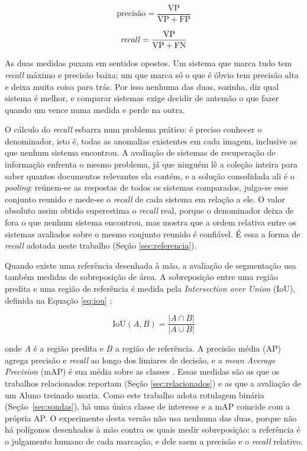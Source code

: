 \begin{equation}
  \text{precisão} = \frac{\mathrm{VP}}{\mathrm{VP} + \mathrm{FP}}
  \label{eq:prec_geral}
\end{equation}

\begin{equation}
  \text{\textit{recall}} = \frac{\mathrm{VP}}{\mathrm{VP} + \mathrm{FN}}
  \label{eq:rec_geral}
\end{equation}

As duas medidas puxam em sentidos opostos. Um sistema que marca tudo tem \textit{recall} máximo e precisão baixa; um que marca só o que é óbvio tem precisão alta e deixa muita coisa para trás. Por isso nenhuma das duas, sozinha, diz qual sistema é melhor, e comparar sistemas exige decidir de antemão o que fazer quando um vence numa medida e perde na outra.

O cálculo do \textit{recall} esbarra num problema prático: é preciso conhecer o denominador, isto é, todas as anomalias existentes em cada imagem, inclusive as que nenhum sistema encontrou. A avaliação de sistemas de recuperação de informação enfrenta o mesmo problema, já que ninguém lê a coleção inteira para saber quantos documentos relevantes ela contém, e a solução consolidada ali é o \textit{pooling}: reúnem-se as respostas de todos os sistemas comparados, julga-se esse conjunto reunido e mede-se o \textit{recall} de cada sistema em relação a ele. O valor absoluto assim obtido superestima o \textit{recall} real, porque o denominador deixa de fora o que nenhum sistema encontrou, mas  mostra que a ordem relativa entre os sistemas avaliados sobre o mesmo conjunto reunido é confiável. É essa a forma de \textit{recall} adotada neste trabalho (Seção \ref{sec:referencia}).

Quando existe uma referência desenhada à mão, a avaliação de segmentação usa também medidas de sobreposição de área. A sobreposição entre uma região predita e uma região de referência é medida pela \textit{Intersection over Union} (IoU), definida na Equação \ref{eq:iou} \cite{voc_everingham2010}:

\begin{equation}
  \mathrm{IoU}(A, B) = \frac{|A \cap B|}{|A \cup B|}
  \label{eq:iou}
\end{equation}

\noindent onde $A$ é a região predita e $B$ a região de referência. A precisão média (AP) agrega precisão e \textit{recall} ao longo dos limiares de decisão, e a \textit{mean Average Precision} (mAP) é sua média sobre as classes \cite{voc_everingham2010}. Essas medidas são as que os trabalhos relacionados reportam (Seção \ref{sec:relacionados}) e as que a avaliação de um Aluno treinado usaria. Como este trabalho adota rotulagem binária (Seção~\ref{sec:sondas}), há uma única classe de interesse e a mAP coincide com a própria AP. O experimento desta versão não usa nenhuma das duas, porque não há polígonos desenhados à mão contra os quais medir sobreposição: a referência é o julgamento humano de cada marcação, e dele saem a precisão e o \textit{recall} relativo.

